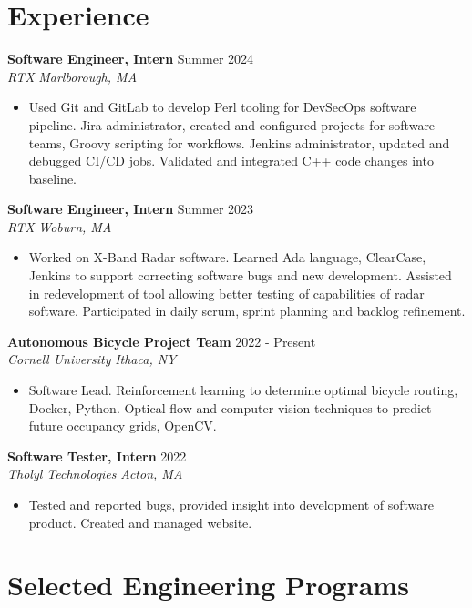 \documentclass[letterpaper,8pt]{article}
\newcommand{\resumeEntry}[4]{
    \vspace{4pt}
    \large \textbf{#1}
    \normalsize \hfill #2
    \\
    \textit{#3} \hfill \textit{#4}
    \vspace{1pt}
}
\newcommand{\itemsBegin}{
    \begin{itemize}[leftmargin=0.2in, labelsep=0.05in, itemsep=0pt, parsep=1pt, topsep=0pt, partopsep=0pt]
}
\newcommand{\itemsEnd}{\end{itemize}}
\begin{document}
\section{Experience}

    \resumeEntry
    {Software Engineer, Intern}
    {Summer 2024}
    {RTX}
    {Marlborough, MA}

    \itemsBegin
        \item Used Git and GitLab to develop Perl tooling for DevSecOps software pipeline. Jira administrator, created and configured projects for software teams, Groovy scripting for workflows. Jenkins administrator, updated and debugged CI/CD jobs. Validated and integrated C++ code changes into baseline.
    \itemsEnd

    \resumeEntry
        {Software Engineer, Intern}
        {Summer 2023}
        {RTX}
        {Woburn, MA}

    \itemsBegin
        \item Worked on X-Band Radar software. Learned Ada language, ClearCase, Jenkins to support correcting software bugs and new development. Assisted in redevelopment of tool allowing better testing of capabilities of radar software. Participated in daily scrum, sprint planning and backlog refinement.
    \itemsEnd

    \resumeEntry
        {Autonomous Bicycle Project Team}
        {2022 - Present}
        {Cornell University}
        {Ithaca, NY}

    \itemsBegin
        \item Software Lead. Reinforcement learning to determine optimal bicycle routing, Docker, Python. Optical flow and computer vision techniques to predict future occupancy grids, OpenCV.
    \itemsEnd

    \resumeEntry
        {Software Tester, Intern}
        {2022}
        {Tholyl Technologies}
        {Acton, MA}

    \itemsBegin
        \item Tested and reported bugs, provided insight into development of software product. Created and managed website.
    \itemsEnd

\section{Selected Engineering Programs}
\end{document}

